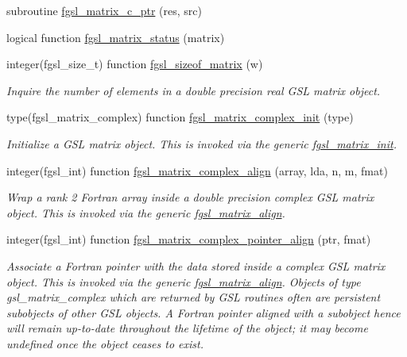 \begin{DoxyCompactItemize}
subroutine \hyperlink{array_8finc_ae039428ac81fb123a5223c7676b1b687}{fgsl\-\_\-matrix\-\_\-c\-\_\-ptr} (res, src)
\item 
logical function \hyperlink{array_8finc_a5d41e00e4a2ec9c3b0594ec77ff02c5e}{fgsl\-\_\-matrix\-\_\-status} (matrix)
\item 
integer(fgsl\-\_\-size\-\_\-t) function \hyperlink{array_8finc_addcfbdff17fa7ce904b853ed793bb1d9}{fgsl\-\_\-sizeof\-\_\-matrix} (w)
\begin{DoxyCompactList}\small\item\em Inquire the number of elements in a double precision real G\-S\-L matrix object. \end{DoxyCompactList}\item 
type(fgsl\-\_\-matrix\-\_\-complex) function \hyperlink{array_8finc_af7461bad6c35fe6dde17e9c06bbc5cd0}{fgsl\-\_\-matrix\-\_\-complex\-\_\-init} (type)
\begin{DoxyCompactList}\small\item\em Initialize a G\-S\-L matrix object. This is invoked via the generic \hyperlink{interfacefgsl__matrix__init}{fgsl\-\_\-matrix\-\_\-init}. \end{DoxyCompactList}\item 
integer(fgsl\-\_\-int) function \hyperlink{array_8finc_ada029e69fd21da1d81472a285f1269a2}{fgsl\-\_\-matrix\-\_\-complex\-\_\-align} (array, lda, n, m, fmat)
\begin{DoxyCompactList}\small\item\em Wrap a rank 2 Fortran array inside a double precision complex G\-S\-L matrix object. This is invoked via the generic \hyperlink{interfacefgsl__matrix__align}{fgsl\-\_\-matrix\-\_\-align}. \end{DoxyCompactList}\item 
integer(fgsl\-\_\-int) function \hyperlink{array_8finc_a000f8ca7f88b4dfb7a5cc700ccf3b868}{fgsl\-\_\-matrix\-\_\-complex\-\_\-pointer\-\_\-align} (ptr, fmat)
\begin{DoxyCompactList}\small\item\em Associate a Fortran pointer with the data stored inside a complex G\-S\-L matrix object. This is invoked via the generic \hyperlink{interfacefgsl__matrix__align}{fgsl\-\_\-matrix\-\_\-align}. Objects of type {\ttfamily gsl\-\_\-matrix\-\_\-complex} which are returned by G\-S\-L routines often are persistent subobjects of other G\-S\-L objects. A Fortran pointer aligned with a subobject hence will remain up-\/to-\/date throughout the lifetime of the object; it may become undefined once the object ceases to exist. \end{DoxyCompactList}\item 

\end{DoxyCompactItemize}
